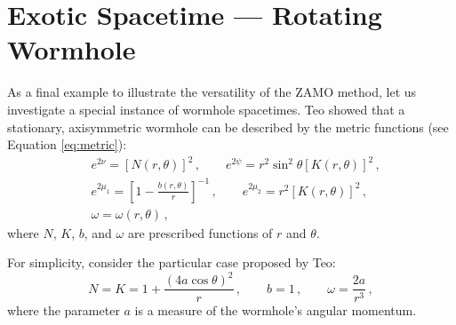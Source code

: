 \documentclass[
    reprint,
    prd,
    nofootinbib,
    amsmath,amssymb,
    aps,
    floatfix,
]{revtex4-2}
\begin{document}
\section{Exotic Spacetime --- Rotating Wormhole} \label{sec:wormhole}


As a final example to illustrate the versatility of the ZAMO method, let us investigate a special instance of wormhole spacetimes. Teo \cite{Teo1998} showed that a stationary, axisymmetric wormhole can be described by the metric functions (see Equation \ref{eq:metric}):
\begin{equation} \label{eq:wormhole_metric}
    \begin{split}
        &e^{2\nu} = [N(r, \theta)]^{2} \, , \qquad e^{2\psi} = r^{2} \sin^{2}{\theta} [K(r, \theta)]^{2} \, , \\
        &e^{2\mu_{1}} = \left[ 1 - \frac{b(r, \theta)}{r} \right]^{-1} \, , \qquad e^{2\mu_{2}} = r^{2} [K(r, \theta)]^{2} \, , \\
        &\omega = \omega(r, \theta) \, ,
    \end{split}
\end{equation}
where $N$, $K$, $b$, and $\omega$ are prescribed functions of $r$ and $\theta$.

For simplicity, consider the particular case proposed by Teo:
\begin{equation}
    N = K = 1 + \frac{(4a\cos{\theta})^{2}}{r} \, , \qquad b = 1 \, , \qquad \omega = \frac{2a}{r^{3}} \, ,
\end{equation}
where the parameter $a$ is a measure of the wormhole's angular momentum.
\end{document}
